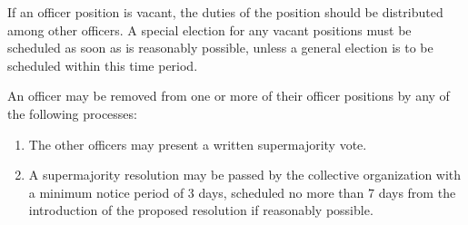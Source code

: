 \documentclass[11pt]{article}
\newcounter{h1}
\newcounter{h2}[h1]
\newcounter{h3}[h2]
\begin{document}

If an officer position is vacant, the duties of the position should be distributed among other officers. A special election for any vacant positions must be scheduled as soon as is reasonably possible, unless a general election is to be scheduled within this time period.


An officer may be removed from one or more of their officer positions by any of the following processes:

\begin{enumerate}
  \item The other officers may present a written supermajority vote.  
  \item A supermajority resolution may be passed by the collective organization with a minimum notice period of 3 days, scheduled no more than 7 days from the introduction of the proposed resolution if reasonably possible.
\end{enumerate}


\end{document}
